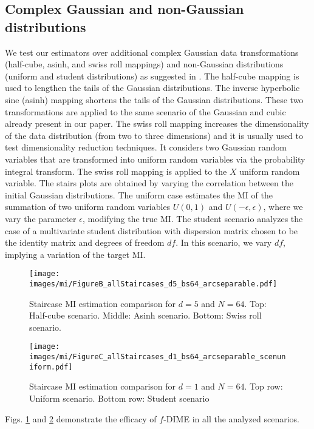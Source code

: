 \subsection{Complex Gaussian and non-Gaussian distributions}
 We test our estimators over additional complex Gaussian data transformations (half-cube, asinh, and swiss roll mappings) and non-Gaussian distributions (uniform and student distributions) as suggested in \cite{czyz2023beyond}. The half-cube mapping is used to lengthen the tails of the Gaussian distributions. The inverse hyperbolic sine (asinh) mapping shortens the tails of the Gaussian distributions. These two transformations are applied to the same scenario of the Gaussian and cubic already present in our paper. The swiss roll mapping increases the dimensionality of the data distribution (from two to three dimensions) and it is usually used to test dimensionality reduction techniques. It considers two Gaussian random variables that are transformed into uniform random variables via the probability integral transform. The swiss roll mapping is applied to the $X$ uniform random variable. The stairs plots are obtained by varying the correlation between the initial Gaussian distributions. The uniform case estimates the MI of the summation of two uniform random variables $U(0,1)$ and $U(-\epsilon, \epsilon)$, where we vary the parameter $\epsilon$, modifying the true MI. The student scenario analyzes the case of a multivariate student distribution with dispersion matrix chosen to be the identity matrix and degrees of freedom $df$. In this scenario, we vary $df$, implying a variation of the target MI. 

\begin{figure}
	\centering
	\texttt{[image: images/mi/FigureB\_allStaircases\_d5\_bs64\_arcseparable.pdf]}
	\caption{Staircase MI estimation comparison for $d=5$ and $N=64$. Top: Half-cube scenario. Middle: Asinh scenario. Bottom: Swiss roll scenario.}
	\label{fig:MI_stairs_d5_bs64_beyond}
\end{figure} 
 \begin{figure}
	\centering
	\texttt{[image: images/mi/FigureC\_allStaircases\_d1\_bs64\_arcseparable\_scenuniform.pdf]}
	\caption{Staircase MI estimation comparison for $d=1$ and $N=64$. Top row: Uniform scenario. Bottom row: Student scenario}
	\label{fig:MI_stairs_d5_bs64_beyond2}
\end{figure} 

Figs. \ref{fig:MI_stairs_d5_bs64_beyond} and \ref{fig:MI_stairs_d5_bs64_beyond2} demonstrate the efficacy of $f$-DIME in all the analyzed scenarios.


